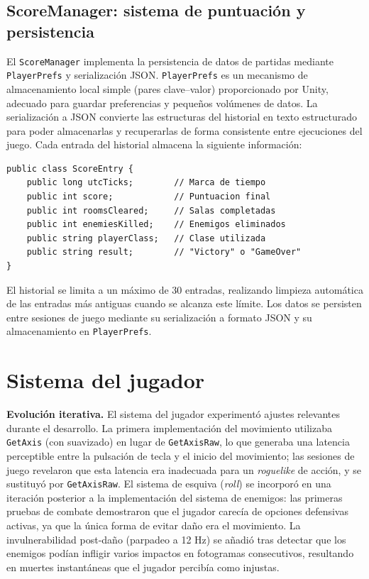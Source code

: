 \subsection{ScoreManager: sistema de puntuación y persistencia}


El \texttt{ScoreManager} implementa la persistencia de datos de partidas mediante \texttt{PlayerPrefs} y serialización JSON. \texttt{PlayerPrefs} es un mecanismo de almacenamiento local simple (pares clave–valor) proporcionado por Unity, adecuado para guardar preferencias y pequeños volúmenes de datos. La serialización a JSON convierte las estructuras del historial en texto estructurado para poder almacenarlas y recuperarlas de forma consistente entre ejecuciones del juego. Cada entrada del historial almacena la siguiente información:

\begin{lstlisting}
public class ScoreEntry {
    public long utcTicks;        // Marca de tiempo
    public int score;            // Puntuacion final
    public int roomsCleared;     // Salas completadas
    public int enemiesKilled;    // Enemigos eliminados
    public string playerClass;   // Clase utilizada
    public string result;        // "Victory" o "GameOver"
}
\end{lstlisting}


El historial se limita a un máximo de 30 entradas, realizando limpieza automática de las entradas más antiguas cuando se alcanza este límite. Los datos se persisten entre sesiones de juego mediante su serialización a formato JSON y su almacenamiento en \texttt{PlayerPrefs}.



\section{Sistema del jugador}


\textbf{Evolución iterativa.} El sistema del jugador experimentó ajustes relevantes durante el desarrollo. La primera implementación del movimiento utilizaba \texttt{GetAxis} (con suavizado) en lugar de \texttt{GetAxisRaw}, lo que generaba una latencia perceptible entre la pulsación de tecla y el inicio del movimiento; las sesiones de juego revelaron que esta latencia era inadecuada para un \textit{roguelike} de acción, y se sustituyó por \texttt{GetAxisRaw}. El sistema de esquiva (\textit{roll}) se incorporó en una iteración posterior a la implementación del sistema de enemigos: las primeras pruebas de combate demostraron que el jugador carecía de opciones defensivas activas, ya que la única forma de evitar daño era el movimiento. La invulnerabilidad post-daño (parpadeo a 12 Hz) se añadió tras detectar que los enemigos podían infligir varios impactos en fotogramas consecutivos, resultando en muertes instantáneas que el jugador percibía como injustas.

